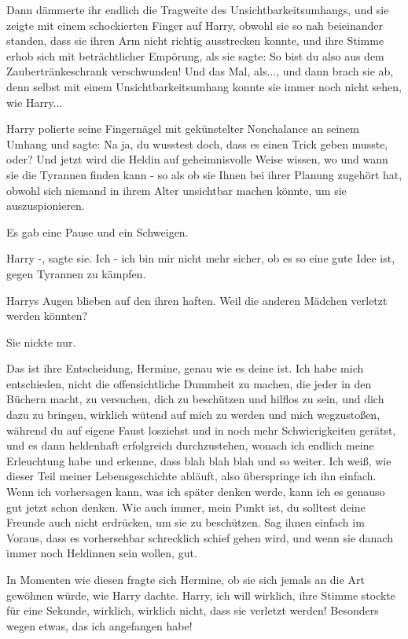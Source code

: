 Dann dämmerte ihr endlich die Tragweite des Unsichtbarkeitsumhangs, und sie
zeigte mit einem schockierten Finger auf Harry, obwohl sie so nah beieinander
standen, dass sie ihren Arm nicht richtig ausstrecken konnte, und ihre Stimme
erhob sich mit beträchtlicher Empörung, als sie sagte: \glqq{}So bist du also aus
dem Zaubertränkeschrank verschwunden! Und das Mal, als...\grqq{}, und dann brach
sie ab, denn selbst mit einem Unsichtbarkeitsumhang konnte sie immer noch nicht
sehen, wie Harry...

Harry polierte seine Fingernägel mit gekünstelter Nonchalance an seinem Umhang
und sagte: \glqq{}Na ja, du wusstest doch, dass es einen Trick geben musste,
oder? Und jetzt wird die Heldin auf geheimnisvolle Weise wissen, wo und wann sie
die Tyrannen finden kann - so als ob sie Ihnen bei ihrer Planung zugehört hat,
obwohl sich niemand in ihrem Alter unsichtbar machen könnte, um sie
auszuspionieren.\grqq{}

Es gab eine Pause und ein Schweigen.

\glqq{}Harry -\grqq{}, sagte sie. \glqq{}Ich - ich bin mir nicht mehr sicher, ob
es so eine gute Idee ist, gegen Tyrannen zu kämpfen.\grqq{}

Harrys Augen blieben auf den ihren haften. \glqq{}Weil die anderen Mädchen
verletzt werden könnten?\grqq{}

Sie nickte nur.

\glqq{}Das ist ihre Entscheidung, Hermine, genau wie es deine ist. Ich habe mich
entschieden, nicht die offensichtliche Dummheit zu machen, die jeder in den
Büchern macht, zu versuchen, dich zu beschützen und hilflos zu sein, und dich
dazu zu bringen, wirklich wütend auf mich zu werden und mich wegzustoßen,
während du auf eigene Faust losziehst und in noch mehr Schwierigkeiten gerätst,
und es dann heldenhaft erfolgreich durchzustehen, wonach ich endlich meine
Erleuchtung habe und erkenne, dass blah blah blah und so weiter. Ich weiß, wie
dieser Teil meiner Lebensgeschichte abläuft, also überspringe ich ihn einfach.
Wenn ich vorhersagen kann, was ich später denken werde, kann ich es genauso gut
jetzt schon denken. Wie auch immer, mein Punkt ist, du solltest deine Freunde
auch nicht erdrücken, um sie zu beschützen. Sag ihnen einfach im Voraus, dass es
vorhersehbar schrecklich schief gehen wird, und wenn sie danach immer noch
Heldinnen sein wollen, gut.\grqq{}

In Momenten wie diesen fragte sich Hermine, ob sie sich jemals an die Art
gewöhnen würde, wie Harry dachte. \glqq{}Harry, ich will wirklich\grqq{}, ihre
Stimme stockte für eine Sekunde, \glqq{}wirklich, wirklich nicht, dass sie
verletzt werden! Besonders wegen etwas, das ich angefangen habe!\grqq{}

